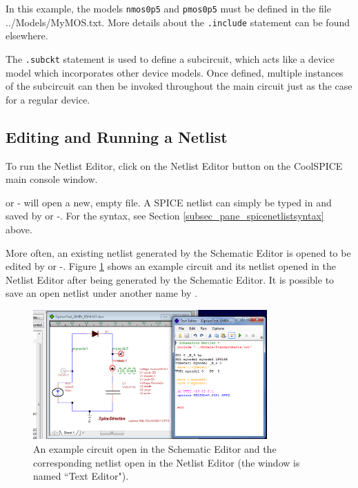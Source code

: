 In this example, the models \texttt{nmos0p5} and \texttt{pmos0p5} must be defined in the file \textsf{../Models/MyMOS.txt}. More details about the \texttt{.include} statement can be found elsewhere.  

The \texttt{.subckt} statement is used to define a subcircuit,  which acts like a device model which incorporates other device models.  Once defined, multiple instances of the subcircuit can then be invoked  throughout the main circuit just as the case for a regular device. 


\subsection{Editing and Running a Netlist}
\label{subsec_pane_editingrunningnetlist}

To run the Netlist Editor, click on the \textsf{Netlist Editor} button on the CoolSPICE main console window.

 or - will open a new, empty file. A SPICE netlist can simply be typed in and saved by  or -.  For the syntax, see Section \ref{subsec_pane_spicenetlistsyntax} above.  

More often, an existing netlist generated by the Schematic Editor is opened to be edited by  or -.  Figure \ref{fig_netlisteditor_netlistexample1} shows an example circuit and its netlist opened in the Netlist Editor after being generated by the Schematic Editor.  It is possible to save an open netlist under another name by .

\begin{figure}[bh]
  \centering
    \includegraphics[width=0.8\textwidth]{./figures/plotter_netlist_editor_figures/NetlistEditor_ExampleNetlist1.png}
    \caption{An example circuit open in the Schematic Editor and the corresponding netlist open in the Netlist Editor (the window is named ``Text Editor").}
  \label{fig_netlisteditor_netlistexample1}
\end{figure} 

